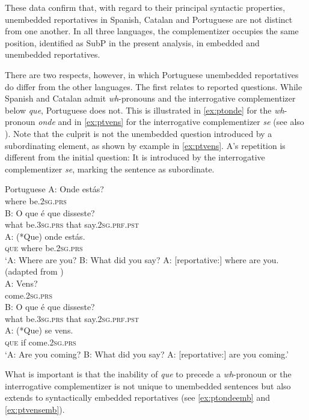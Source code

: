 These data confirm that, with regard to their principal syntactic properties,  unembedded reportatives  in Spanish, Catalan and Portuguese are not distinct from one another. In all three languages, the complementizer occupies the same position, identified  as SubP in the present analysis, in embedded and unembedded reportatives.


 There are two  respects, however, in which Portuguese unembedded reportatives do differ from the other languages. 
The first relates to reported questions. While Spanish and Catalan admit \textit{wh}-pronouns and the interrogative complementizer below \emph{que}, Portuguese does not.  This is illustrated in \eqref{ex:ptonde} for the \textit{wh}-pronoun \emph{onde} and in \eqref{ex:ptvens} for the interrogative complementizer \emph{se} (see also \citealt[178: ex 61]{Corr2016}). Note that the culprit is not the unembedded question introduced by a subordinating element, as shown by  example in \eqref{ex:ptvens}. A's repetition is different from  the initial  question:  It is introduced by the interrogative complementizer \emph{se}, marking the sentence as subordinate.
	

\ea Portuguese 
\ea\label{ex:ptonde}
\gll A: Onde estás? \\
	{} where be.\textsc{2sg.prs}\\
	\exi{}\gll B: {O que} é que disseste? \\
	{} what be.\textsc{3sg.prs} that say.\textsc{2sg.prf.pst}\\
	\exi{}\gll A: (*Que) onde estás.\\
	{} \textsc{que} where be.\textsc{2sg.prs}\\
	\glt `A: Where are you? B: What did you say? A: [reportative:]  where are you.
\ex\label{ex:ptvens}
(adapted from \citealt[178: ex 61]{Corr2016})\\ 
\gll  A: Vens? \\
{} come.\textsc{2sg.prs}\\
\exi{}\gll B: {O que} é que disseste? \\
{} what be.\textsc{3sg.prs} that say.\textsc{2sg.prf.pst}\\
\exi{} \gll A: (*Que) se vens. \\
{} \textsc{que} if come.\textsc{2sg.prs}\\
\glt `A: Are you coming? B: What did you say? A: [reportative:]  are you  coming.' 
\z
\z
	
What is important is that  the inability of \emph{que} to precede a \textit{wh}-pronoun or the interrogative complementizer is  not unique to unembedded sentences but also extends to syntactically embedded reportatives (see \eqref{ex:ptondeemb} and \eqref{ex:ptvensemb}). 

